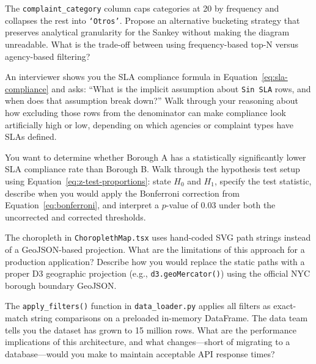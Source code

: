\begin{challengebox}
The \texttt{complaint\_category} column caps categories at 20 by frequency and collapses the rest into \texttt{`Otros'}. Propose an alternative bucketing strategy that preserves analytical granularity for the Sankey without making the diagram unreadable. What is the trade-off between using frequency-based top-N versus agency-based filtering?
\end{challengebox}

\begin{interviewbox}
An interviewer shows you the SLA compliance formula in Equation~\ref{eq:sla-compliance} and asks: ``What is the implicit assumption about \texttt{Sin SLA} rows, and when does that assumption break down?'' Walk through your reasoning about how excluding those rows from the denominator can make compliance look artificially high or low, depending on which agencies or complaint types have SLAs defined.
\end{interviewbox}

\begin{interviewbox}
You want to determine whether Borough A has a statistically significantly lower SLA compliance rate than Borough B. Walk through the hypothesis test setup using Equation~\ref{eq:z-test-proportions}: state $H_0$ and $H_1$, specify the test statistic, describe when you would apply the Bonferroni correction from Equation~\ref{eq:bonferroni}, and interpret a $p$-value of 0.03 under both the uncorrected and corrected thresholds.
\end{interviewbox}

\begin{challengebox}
The choropleth in \texttt{ChoroplethMap.tsx} uses hand-coded SVG path strings instead of a GeoJSON-based projection. What are the limitations of this approach for a production application? Describe how you would replace the static paths with a proper D3 geographic projection (e.g., \texttt{d3.geoMercator()}) using the official NYC borough boundary GeoJSON.
\end{challengebox}

\begin{interviewbox}
The \texttt{apply\_filters()} function in \texttt{data\_loader.py} applies all filters as exact-match string comparisons on a preloaded in-memory DataFrame. The data team tells you the dataset has grown to 15 million rows. What are the performance implications of this architecture, and what changes---short of migrating to a database---would you make to maintain acceptable API response times?
\end{interviewbox}

